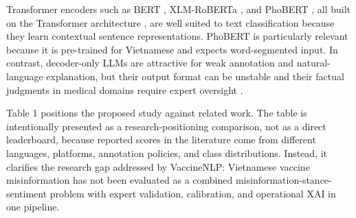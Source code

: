 \documentclass[runningheads]{llncs}
\begin{document}
Transformer encoders such as BERT \cite{devlin2019bert}, XLM-RoBERTa \cite{conneau2020xlmr}, and PhoBERT \cite{nguyen2020phobert}, all built on the Transformer architecture \cite{vaswani2017attention}, are well suited to text classification because they learn contextual sentence representations. PhoBERT is particularly relevant because it is pre-trained for Vietnamese and expects word-segmented input. In contrast, decoder-only LLMs are attractive for weak annotation and natural-language explanation, but their output format can be unstable and their factual judgments in medical domains require expert oversight \cite{gilardi2023chatgpt,singhal2023medpalm}.

Table 1 positions the proposed study against related work. The table is intentionally presented as a research-positioning comparison, not as a direct leaderboard, because reported scores in the literature come from different languages, platforms, annotation policies, and class distributions. Instead, it clarifies the research gap addressed by VaccineNLP: Vietnamese vaccine misinformation has not been evaluated as a combined misinformation-stance-sentiment problem with expert validation, calibration, and operational XAI in one pipeline.
\end{document}
